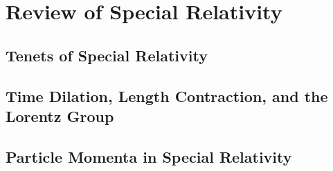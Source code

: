 \chapter{Review of Special Relativity}

\section{Tenets of Special Relativity}

\section{Time Dilation, Length Contraction, and the Lorentz Group}

\section{Particle Momenta in Special Relativity}